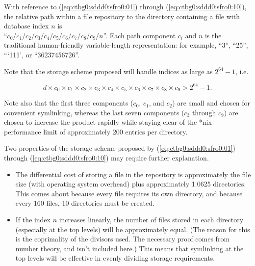 With reference to (\ref{eq:ctbg0:sddd0:sfro0:01})
through (\ref{eq:ctbg0:sddd0:sfro0:10}), the relative path within a file repository
to the directory containing a file with database index $n$ is\\
``$c_0$/$c_1$/$c_2$/$c_3$/$c_4$/$c_5$/$c_6$/$c_7$/$c_8$/$c_9$/$n$''\@.
Each path component $c_i$ and $n$ is the traditional human-friendly variable-length
representation:
for example, ``3'', ``25'', ```111', or ``36237456726''.  

Note that the storage scheme proposed will handle indices 
as large as $2^{64}-1$, i.e.

\begin{equation}
\label{eq:ctbg0:sddd0:sfro0:20}
d \times c_0 \times c_1 \times c_2 \times c_3 \times c_4
\times c_5 \times c_6 \times c_7 \times c_8 \times c_9 > 2^{64} - 1 .
\end{equation}

Note also that the first three
components ($c_0$, $c_1$, and $c_2$) are small and chosen for 
convenient symlinking, whereas the last seven components ($c_3$ through $c_9$)
are chosen to increase the product rapidly while staying clear of the 
*nix performance limit of approximately 200 entries per directory.

Two properties of the storage scheme proposed by (\ref{eq:ctbg0:sddd0:sfro0:01})
through (\ref{eq:ctbg0:sddd0:sfro0:10}) may require further explanation.

\begin{itemize}
\item The differential cost of storing a file in the repository is
      approximately the file size (with operating system overhead)
      plus approximately 1.0625 directories.  This comes about because
      every file requires its own directory, and because
      every 160 files, 10 directories must be created.
\item If the index $n$ increases linearly, the number of files stored in
      each directory (especially at the top levels) will be approximately
      equal.  (The reason for this is the coprimality of the divisors
      used.  The necessary proof comes from number theory, and isn't 
      included here.)  This means that symlinking at the top levels will be
      effective in evenly dividing storage requirements.
\end{itemize}



